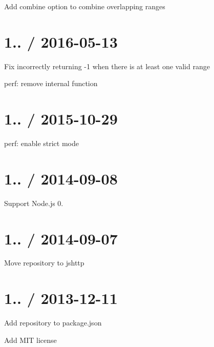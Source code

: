 
\begin{DoxyItemize}
\item Add {\ttfamily combine} option to combine overlapping ranges
\end{DoxyItemize}

\section*{1.. / 2016-\/05-\/13 }


\begin{DoxyItemize}
\item Fix incorrectly returning -\/1 when there is at least one valid range
\item perf\+: remove internal function
\end{DoxyItemize}

\section*{1.. / 2015-\/10-\/29 }


\begin{DoxyItemize}
\item perf\+: enable strict mode
\end{DoxyItemize}

\section*{1.. / 2014-\/09-\/08 }


\begin{DoxyItemize}
\item Support Node.\+js 0.
\end{DoxyItemize}

\section*{1.. / 2014-\/09-\/07 }


\begin{DoxyItemize}
\item Move repository to jshttp
\end{DoxyItemize}

\section*{1.. / 2013-\/12-\/11 }


\begin{DoxyItemize}
\item Add repository to package.\+json
\item Add M\+IT license
\end{DoxyItemize}

